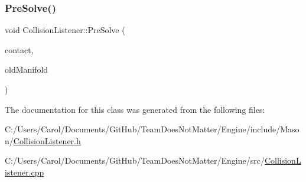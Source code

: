 \hypertarget{class_mason_1_1_collision_listener_accc6ff23dcbf8cbef31e68fe3c56837a}{}\label{class_mason_1_1_collision_listener_accc6ff23dcbf8cbef31e68fe3c56837a} 
\subsubsection{\texorpdfstring{Pre\+Solve()}{PreSolve()}}
{\footnotesize\ttfamily void Collision\+Listener\+::\+Pre\+Solve (\begin{DoxyParamCaption}\item[{b2\+Contact $\ast$}]{contact,  }\item[{const b2\+Manifold $\ast$}]{old\+Manifold }\end{DoxyParamCaption})\hspace{0.3cm}{\ttfamily [virtual]}}



The documentation for this class was generated from the following files\+:\begin{DoxyCompactItemize}
\item 
C\+:/\+Users/\+Carol/\+Documents/\+Git\+Hub/\+Team\+Does\+Not\+Matter/\+Engine/include/\+Mason/\hyperlink{_collision_listener_8h}{Collision\+Listener.\+h}\item 
C\+:/\+Users/\+Carol/\+Documents/\+Git\+Hub/\+Team\+Does\+Not\+Matter/\+Engine/src/\hyperlink{_collision_listener_8cpp}{Collision\+Listener.\+cpp}\end{DoxyCompactItemize}
